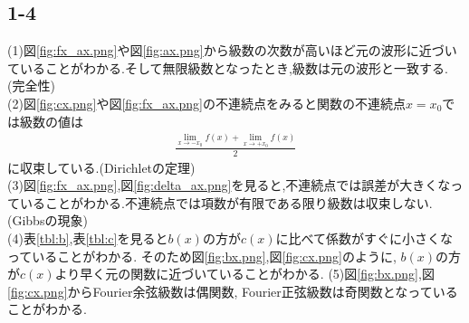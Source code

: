 \subsection*{1-4}\noindent
(1)図\ref{fig:fx_ax.png}や図\ref{fig:ax.png}から級数の次数が高いほど元の波形に近づいていることがわかる.そして無限級数となったとき,級数は元の波形と一致する.(完全性)\\
(2)図\ref{fig:cx.png}や図\ref{fig:fx_ax.png}の不連続点をみると関数の不連続点$x=x_0$では級数の値は
\begin{align*}
  \frac{\displaystyle\lim_{x\rightarrow-x_0}f(x)+\displaystyle\lim_{x\rightarrow+x_0}f(x)}{2}
\end{align*}
に収束している.(Dirichletの定理)\\
(3)図\ref{fig:fx_ax.png},図\ref{fig:delta_ax.png}を見ると,不連続点では誤差が大きくなっていることがわかる.不連続点では項数が有限である限り級数は収束しない.(Gibbsの現象)\\
(4)表\ref{tbl:b},表\ref{tbl:c}を見ると$b(x)$の方が$c(x)$に比べて係数がすぐに小さくなっていることがわかる.
そのため図\ref{fig:bx.png},図\ref{fig:cx.png}のように, $b(x)$の方が$c(x)$より早く元の関数に近づいていることがわかる.
(5)図\ref{fig:bx.png},図\ref{fig:cx.png}からFourier余弦級数は偶関数, Fourier正弦級数は奇関数となっていることがわかる.